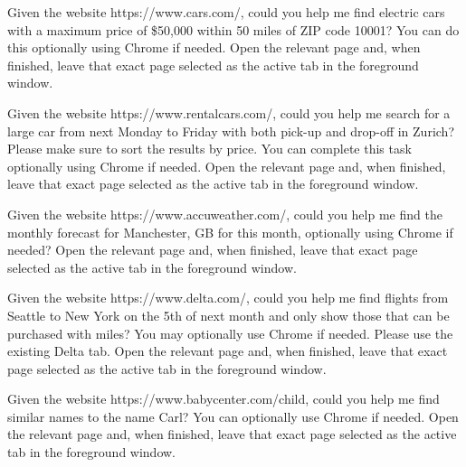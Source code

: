 \begin{instructionbox}
Given the website \textasciigrave{}https://www.cars.com/\textasciigrave{}, could you help me find electric cars with a maximum price of \$50,000 within 50 miles of ZIP code 10001? You can do this optionally using Chrome if needed. Open the relevant page and, when finished, leave that exact page selected as the active tab in the foreground window.
\end{instructionbox}

\begin{instructionbox}
Given the website \textasciigrave{}https://www.rentalcars.com/\textasciigrave{}, could you help me search for a large car from next Monday to Friday with both pick-up and drop-off in Zurich? Please make sure to sort the results by price. You can complete this task optionally using Chrome if needed. Open the relevant page and, when finished, leave that exact page selected as the active tab in the foreground window.
\end{instructionbox}

\begin{instructionbox}
Given the website \textasciigrave{}https://www.accuweather.com/\textasciigrave{}, could you help me find the monthly forecast for Manchester, GB for this month, optionally using Chrome if needed? Open the relevant page and, when finished, leave that exact page selected as the active tab in the foreground window.
\end{instructionbox}

\begin{instructionbox}
Given the website \textasciigrave{}https://www.delta.com/\textasciigrave{}, could you help me find flights from Seattle to New York on the 5th of next month and only show those that can be purchased with miles? You may optionally use Chrome if needed. Please use the existing Delta tab. Open the relevant page and, when finished, leave that exact page selected as the active tab in the foreground window.
\end{instructionbox}

\begin{instructionbox}
Given the website \textasciigrave{}https://www.babycenter.com/child\textasciigrave{}, could you help me find similar names to the name Carl? You can optionally use Chrome if needed. Open the relevant page and, when finished, leave that exact page selected as the active tab in the foreground window.
\end{instructionbox}

